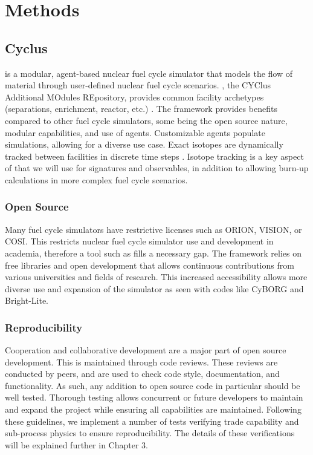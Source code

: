 \chapter[Methods]{Methods}
\section{Cyclus}

\Cyclus is a modular, agent-based nuclear fuel cycle simulator that models the flow of material through user-defined nuclear fuel cycle scenarios. \Cycamore, the CYClus 
Additional MOdules REpository, provides common facility archetypes (separations, enrichment, reactor, etc.) \cite{carlsen_cycamore_2014}. 
The \Cyclus framework provides benefits compared to other fuel cycle simulators, some being the open source nature, modular capabilities, and use of agents.
Customizable agents populate simulations, allowing for a diverse use case. Exact isotopes are dynamically tracked between facilities in discrete time steps \cite{huff_fundamental_2016}.
Isotope tracking is a key aspect of \Cyclus that we will use for signatures and observables, in addition to allowing burn-up calculations in more complex fuel cycle scenarios.

\subsection{Open Source}

Many fuel cycle simulators have restrictive licenses such as ORION, VISION, or COSI. This restricts
nuclear fuel cycle simulator use and development in academia, therefore a tool such as \Cyclus fills a necessary gap. The \Cyclus framework relies on
free libraries and open development that allows continuous contributions from various universities and fields of research. This increased accessibility allows
more diverse use and expansion of the simulator as seen with codes like CyBORG and Bright-Lite.

\subsection{Reproducibility}
Cooperation and collaborative development are a major part of open source development. This is maintained through code reviews. These reviews are conducted by peers,
and are used to check code style, documentation, and functionality. As such, any addition to open source code in particular should be well tested.
Thorough testing allows concurrent or future developers to maintain and expand the project while ensuring all capabilities are maintained. Following these guidelines, we
implement a number of tests verifying trade capability and sub-process physics to ensure reproducibility. The details of these verifications will be explained further in Chapter 3.

